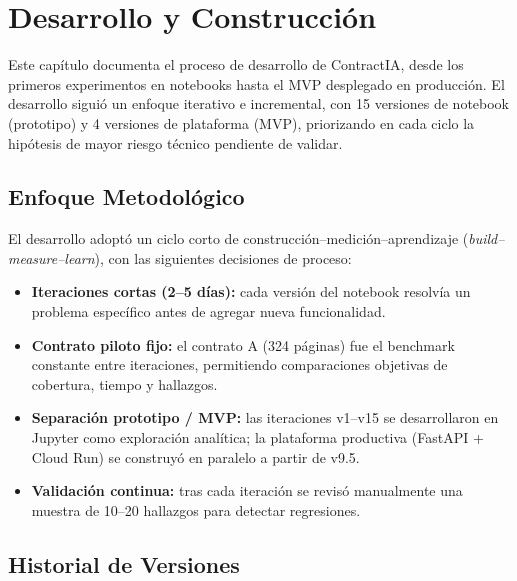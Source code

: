 \chapter{Desarrollo y Construcción}

Este capítulo documenta el proceso de desarrollo de ContractIA, desde los
primeros experimentos en notebooks hasta el MVP desplegado en producción.
El desarrollo siguió un enfoque iterativo e incremental, con 15 versiones
de notebook (prototipo) y 4 versiones de plataforma (MVP), priorizando en
cada ciclo la hipótesis de mayor riesgo técnico pendiente de validar.

\section{Enfoque Metodológico}

El desarrollo adoptó un ciclo corto de construcción–medición–aprendizaje
(\textit{build–measure–learn}), con las siguientes decisiones de proceso:

\begin{itemize}
    \item \textbf{Iteraciones cortas (2--5 días):} cada versión del notebook
    resolvía un problema específico antes de agregar nueva funcionalidad.
    \item \textbf{Contrato piloto fijo:} el contrato A
    (324 páginas) fue el benchmark constante entre iteraciones, permitiendo
    comparaciones objetivas de cobertura, tiempo y hallazgos.
    \item \textbf{Separación prototipo / MVP:} las iteraciones v1--v15 se
    desarrollaron en Jupyter como exploración analítica; la plataforma
    productiva (FastAPI + Cloud Run) se construyó en paralelo a partir de v9.5.
    \item \textbf{Validación continua:} tras cada iteración se revisó
    manualmente una muestra de 10--20 hallazgos para detectar regresiones.
\end{itemize}

\section{Historial de Versiones}


